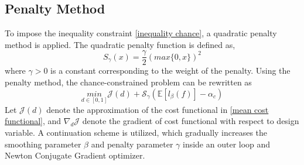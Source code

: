 \documentclass[pdf-a,balance,colorlinks,upint,subscriptcorrection,varvw,mathalfa=cal=boondoxo, spanish,french,vietnamese,russian,greek]{asmeconf}
\begin{document}
\subsection{Penalty Method}
\noindent 
To impose the inequality constraint \eqref{inequality chance}, a quadratic penalty method \cite{nocedal2006quadratic} is applied. The quadratic penalty function is defined as,
\begin{equation}
        S_{\gamma}(x) = \frac{\gamma}{2}{(max{\{0,x\}})}^2
\end{equation}
where $\gamma > 0$ is a constant corresponding to the weight of the penalty. Using the penalty method, the chance-constrained problem can be rewritten as
\begin{equation}\label{eq: optimization_penalty}
    \underset{d \in [0,1]}{min} \mathcal{J}(d) + \mathcal{S}_{\gamma}(\mathbb{E}[l_\beta(f)] - \alpha_c)  
\end{equation}
Let $\mathcal{J}(d)$ denote the approximation of the cost functional in \eqref{mean cost functional}, and $\nabla_{d} \mathcal{J}$ denote the gradient of cost functional with respect to design variable. A continuation scheme \cite{chen2021taylor} is utilized, which gradually increases the smoothing parameter $\beta$ and penalty parameter $\gamma$ inside an outer loop and Newton Conjugate Gradient optimizer. 
\end{document}
